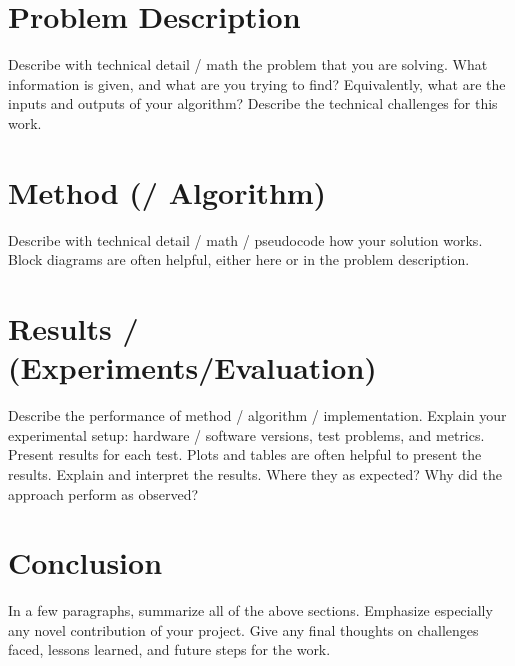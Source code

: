 \documentclass[conference,letterpaper]{IEEEtran}
\begin{document}
\section{Problem Description}

Describe with technical detail / math the problem that you are solving.  What
information is given, and what are you trying to find?  Equivalently, what are
the inputs and outputs of your algorithm?  Describe the technical challenges
for this work.

\section{Method (/ Algorithm)}

Describe with technical detail / math / pseudocode how your solution works.
Block diagrams are often helpful, either here or in the problem description.

\section{Results / (Experiments/Evaluation)}


Describe the performance of method / algorithm / implementation.
Explain your experimental setup: hardware / software versions, test
problems, and metrics.  Present results for each test.  Plots and
tables are often helpful to present the results.  Explain and
interpret the results.  Where they as expected?  Why did the approach
perform as observed?

\section{Conclusion}

In a few paragraphs, summarize all of the above sections.  Emphasize especially
any novel contribution of your project.  Give any final thoughts on challenges
faced, lessons learned, and future steps for the work.

\printbibliography
\end{document}
